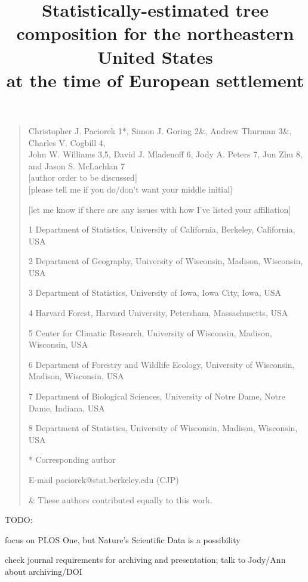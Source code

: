 \documentclass[12pt]{article}\usepackage[]{graphicx}\usepackage[]{color}
\begin{document}
\title{Statistically-estimated tree composition for the northeastern United
States \\
at the time of European settlement}
\maketitle
\begin{quote}
Christopher J. Paciorek 1{*}, Simon J. Goring 2\&, Andrew Thurman
3\&, Charles V. Cogbill 4, \\
John W. Williams 3,5, David J. Mladenoff 6, Jody A. Peters 7, Jun
Zhu 8, \\
and Jason S. McLachlan 7 \\
{[}author order to be discussed{]}\\
{[}please tell me if you do/don't want your middle initial{]}

{[}let me know if there are any issues with how I've listed your affiliation{]}

1 Department of Statistics, University of California, Berkeley, California,
USA

2 Department of Geography, University of Wisconsin, Madison, Wisconsin,
USA

3 Department of Statistics, University of Iowa, Iowa City, Iowa, USA

4 Harvard Forest, Harvard University, Petersham, Massachusetts, USA

5 Center for Climatic Research, University of Wisconsin, Madison,
Wisconsin, USA

6 Department of Forestry and Wildlife Ecology, University of Wisconsin,
Madison, Wisconsin, USA

7 Department of Biological Sciences, University of Notre Dame, Notre
Dame, Indiana, USA

8 Department of Statistics, University of Wisconsin, Madison, Wisconsin,
USA

{*} Corresponding author

E-mail paciorek@stat.berkeley.edu (CJP)

\& These authors contributed equally to this work. 
\end{quote}
TODO:

focus on PLOS One, but Nature's Scientific Data is a possibility

check journal requirements for archiving and presentation; talk to
Jody/Ann about archiving/DOI
\end{document}
